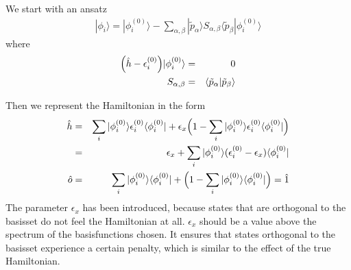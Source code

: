 \documentclass[11pt,a4paper]{report}
\begin{document}
We start with an ansatz
\begin{eqnarray}
|\phi_i\rangle=|\phi^{(0)}_i\rangle-\sum_{\alpha,\beta}|\tilde{p}_\alpha\rangle
S_{\alpha,\beta}\langle\tilde{p}_\beta|\phi^{(0)}_i\rangle
\end{eqnarray}
where 
\begin{eqnarray}
\Bigl(\hat{h}-\epsilon_i^{(0)}\Bigr)|\phi^{(0)}_i\rangle&=&0
\\
S_{\alpha,\beta}&=&\langle\tilde{p}_\alpha|\tilde{p}_\beta\rangle
\end{eqnarray}

Then we represent the Hamiltonian in the form
\begin{eqnarray}
\hat{h}&=&
\sum_i|\phi_i^{(0)}\rangle\epsilon_i^{(0)}\langle\phi_i^{(0)}|
+\epsilon_x\Bigl(1-\sum_i|\phi_i^{(0)}\rangle\epsilon_i^{(0)}\langle\phi_i^{(0)}|\Bigr)
\nonumber\\
&=&\epsilon_x+\sum_i|\phi_i^{(0)}\rangle(\epsilon_i^{(0)}-\epsilon_x)
\langle\phi_i^{(0)}|
\\
\hat{o}&=&
\sum_i|\phi_i^{(0)}\rangle\langle\phi_i^{(0)}|
+\Bigl(1-\sum_i|\phi_i^{(0)}\rangle\langle\phi_i^{(0)}|\Bigr)
=\hat{1}
\end{eqnarray}
The parameter $\epsilon_x$ has been introduced, because states that
are orthogonal to the basisset do not feel the Hamiltonian at
all. $\epsilon_x$ should be a value above the spectrum of the
basisfunctions chosen. It ensures that states orthogonal to the
basisset experience a certain penalty, which is similar to the effect
of the true Hamiltonian.
\end{document}
